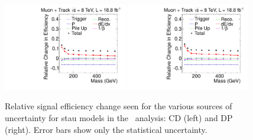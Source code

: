 \begin{figure}[ht]
\centering
  \includegraphics[clip=false, trim=0.0cm 0cm 0.0cm 0cm, width=0.48\textwidth]{figures/tkmu/MuGMStauUncertainty}
  \includegraphics[clip=false, trim=0.0cm 0cm 0.0cm 0cm, width=0.48\textwidth]{figures/tkmu/MuPPStauUncertainty} \\
\caption[Relative signal efficiency change seen for the various sources of uncertainty for stau models in the \tktof\ analysis]
{Relative signal efficiency change seen for the various sources of uncertainty for stau models in the \tktof\ analysis: CD (left) and DP (right).
Error bars show only the statistical uncertainty.
}
    \label{fig:TkMuStauUncSource}
\end{figure}

